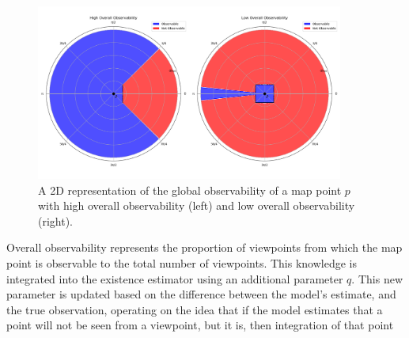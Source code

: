 \begin{figure}[!ht]
    \centering
    \includegraphics[width=0.9\textwidth]{resources/overall_observability.png}
    \caption[Overall Observability]{A 2D representation of the global observability of a map point $p$ with high overall observability (left) and low overall observability (right).}
    \label{fig:overall_observability}
\end{figure}

Overall observability represents the proportion of viewpoints from which the map point is observable to the total number of viewpoints. This knowledge is integrated into the existence estimator using an additional parameter $q$. This new parameter is updated based on the difference between the model's estimate, and the true observation, operating on the idea that if the model estimates that a point will not be seen from a viewpoint, but it is, then integration of that point 